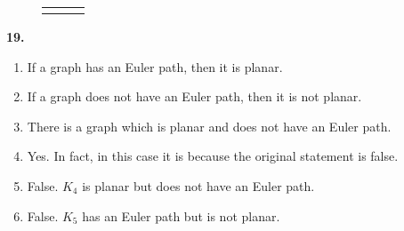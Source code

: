 \documentclass[10pt,]{book}
\theoremstyle{plain}
\theoremstyle{definition}
\theoremstyle{definition}
\theoremstyle{definition}
\numberwithin{equation}{chapter}
\newlength{\panelmax}
\begin{document}
{\setlength{\panelmax}{\maxof{\panelmax}{\phEBimage}}
\leavevmode%
\setlength{\tabcolsep}{0\textwidth}
\begin{figure}
\begin{tabular}{@{}*{3}{c}@{}}
\begin{minipage}[c][\panelmax][t]{0.333333333333333\textwidth}\usebox{\panelboxDZimage}\end{minipage}&
\begin{minipage}[c][\panelmax][t]{0.333333333333333\textwidth}\usebox{\panelboxEAimage}\end{minipage}&
\begin{minipage}[c][\panelmax][t]{0.333333333333333\textwidth}\usebox{\panelboxEBimage}\end{minipage}\end{tabular}
\end{figure}
}%


\par\smallskip
\noindent\textbf{19.}\quad{}\leavevmode%
\begin{enumerate}[label=(\alph*)]
\item\hypertarget{li-1289}{}
                If a graph has an Euler path, then it is planar.
\item\hypertarget{li-1290}{}
                If a graph does not have an Euler path, then it is not planar.
\item\hypertarget{li-1291}{}
                There is a graph which is planar and does not have an Euler path.
\item\hypertarget{li-1292}{}
                Yes. In fact, in this case it is because the original statement is false.
\item\hypertarget{li-1293}{}
                False. \(K_4\) is planar but does not have an Euler path.
\item\hypertarget{li-1294}{}
                False. \(K_5\) has an Euler path but is not planar.
\end{enumerate}
\par\smallskip
\end{document}
